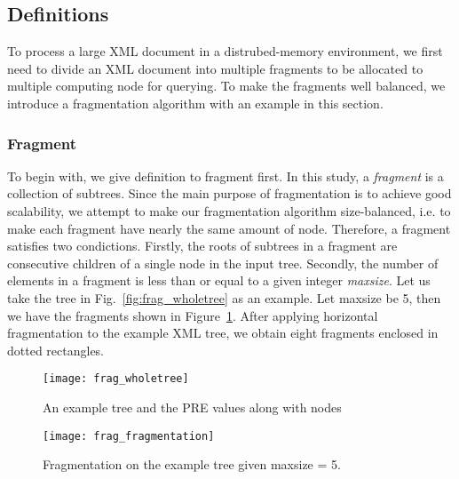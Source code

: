 \subsection{Definitions}

To process a large XML document in a distrubed-memory environment,  we first
need to divide an XML document into multiple fragments to be allocated to
multiple computing node for querying. To make the fragments well balanced, we
introduce a fragmentation algorithm with an example in this section.

\subsubsection{Fragment}

To begin with, we give definition to fragment first. In this study, a
\emph{fragment} is a collection of subtrees. Since the main purpose of
fragmentation is to achieve good scalability, we attempt to make our
fragmentation algorithm size-balanced, i.e. to make each fragment have nearly
the same amount of node.  Therefore, a fragment satisfies two condictions.
Firstly, the roots of subtrees in a fragment are consecutive children of a
single  node in the input tree. Secondly, the number of elements in a fragment
is  less than or equal to a given integer \emph{maxsize}.  Let us take the tree
in Fig.~\ref{fig:frag_wholetree} as an example. Let maxsize be 5, then we have
the fragments shown in Figure~\ref{fig:frag_fragmentation}. After applying
horizontal fragmentation to the example XML tree, we obtain eight fragments
enclosed in dotted rectangles.


\begin{figure}[t] 
	\centering
	\texttt{[image: frag\_wholetree]}
	\caption{An example tree and the PRE values along with nodes}
	\label{fig:frag_wholetree}
	\texttt{[image: frag\_fragmentation]}
	\caption{Fragmentation on the example tree given maxsize = 5.}
	\label{fig:frag_fragmentation}	
\end{figure}


